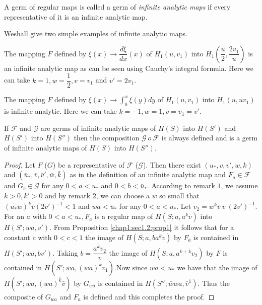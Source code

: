 \begin{defi*}%
  A germ of regular maps is called a germ of {\em{infinite analytic
      maps}}  if every representative of it is an infinite analytic
  map. 
\end{defi*}

We\pageoriginale shall give two simple examples of infinite analytic maps.

\begin{example}\label{chap1:sec1.2:exp1}%
  The mapping $F$ defined by $\xi (x) \rightarrow \dfrac{d \xi }{d x
  }(x)$ of $H_1(u,  v_1)$ into $H_1 \left(\dfrac{u}{2},  \dfrac{2v_1}{u}\right)$
  is an infinite analytic map as can be seen using Cauchy's integral
  formula. Here we can take $k =1,  w = \dfrac{1}{2},  v = v_1$  and
  $v' = 2v_1$. 
\end{example}

\begin{example}\label{chap1:sec1.2:exp2}%
  The mapping $F$ defined by $\xi (x) \rightarrow \int_0^x \xi (y) dy$
  of $H_1(u,  v_1)$ into $H_1(u,  uv_1)$ is infinite analytic. Here we
  can take $k = - 1,  w = 1 ,  v = v_1 = v'$. 
\end{example}

\begin{proposition}\label{chap1:sec1.2:prop4}%
  If $\mathscr{F}$ and $\mathscr{G}$ are germs of infinite analytic
  maps of $H(S)$ into $H(S')$ and $H(S')$ into $H(S'')$ then the composition
  $\mathscr{G} ~o ~ \mathscr{F}$ is always defined and is a germ of
  infinite analytic maps of $H(S)$ into $H(S'')$. 
\end{proposition}

\begin{proof}%
  Let $F$ (\resp  $G$) be a representative of $\mathscr{F}$
  (\resp  $\mathscr{G}$). Then there exist $(u_*,  v,  v',  w,  k)$ and
  $(\bar{u}_*,  \bar{v},  \bar{v}',  \bar{w},  \bar{k})$ as in the
  definition of an infinite analytic map and $F_a \in \mathscr{F}$ and
  $G_b \in \mathscr{G}$ for any $0 < a < u_*$ and $0 < b <
  \bar{u}_*$. According to remark $1$,  we assume $k > 0,  k' >0$ and
  by remark $2$,  we can choose a $w$ so small that $(u_* w)^{\bar{k}}
  \bar{v}(2v')^{-1} < 1$ and $wa < \bar{u}_*$ for any $0 < a <
  u_*$. Let $v_2 = w^{\bar{k}}\bar{v} ~ v ~ (2v')^{-1}$. For an $a$
  with $0 < a < u_*,  F_a$ is a regular map of $H(S; a,  a^k v)$ into
  $H(S' ; wa,  v')$. From Proposition \ref{chap1:sec1.2:prop1} it follows that for a
  constant $c$ with $0 < c < 1$ the image of $H(S; a,  ba^k v)$ by
  $F_a$ is contained in $H(S'; wa,  bv')$. Taking $b =
  \dfrac{a^{\bar{k}} v_2}{v}$ the image of $H(S; a,  a^{k + \bar{k}}
  v_2)$ by  $F$ is contained in $H(S'; wa,
  (wa)^{\bar{k}}\bar{v}_1)$.\pageoriginale Now since $wa < \bar{u}_*$ we have that
  the image of $H(S'; wa,  (wa)^{\bar{k}}\bar{v})$ by $G_{wa}$ is
  contained in $H(S''; \bar{w}wa,  \bar{v}^1)$. Thus the composite of
  $G_{wa}$ and $F_a$ is defined and this completes the proof. 
\end{proof}

